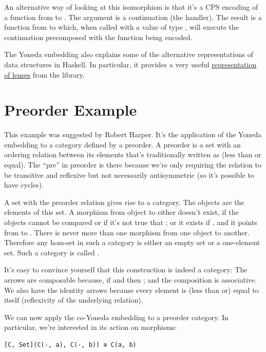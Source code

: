 An alternative way of looking at this isomorphism is that it's a CPS
encoding of a function from  to . The argument
 is a continuation (the handler). The result
is a function from  to  which, when called with a
value of type , will execute the continuation precomposed with
the function being encoded.

The Yoneda embedding also explains some of the alternative
representations of data structures in Haskell. In particular, it
provides a very useful
\href{https://bartoszmilewski.com/2015/07/13/from-lenses-to-yoneda-embedding/}{representation
of lenses} from the  library.

\section{Preorder Example}\label{preorder-example}

This example was suggested by Robert Harper. It's the application of the
Yoneda embedding to a category defined by a preorder. A preorder is a
set with an ordering relation between its elements that's traditionally
written as \code{<=} (less than or equal). The ``pre'' in
preorder is there because we're only requiring the relation to be
transitive and reflexive but not necessarily antisymmetric (so it's
possible to have cycles).

A set with the preorder relation gives rise to a category. The objects
are the elements of this set. A morphism from object  to
 either doesn't exist, if the objects cannot be compared or if
it's not true that ; or it exists if
, and it points from  to
. There is never more than one morphism from one object to
another. Therefore any hom-set in such a category is either an empty set
or a one-element set. Such a category is called .

It's easy to convince yourself that this construction is indeed a
category: The arrows are composable because, if
 and  then
; and the composition is associative. We also
have the identity arrows because every element is (less than or) equal
to itself (reflexivity of the underlying relation).

We can now apply the co-Yoneda embedding to a preorder category. In
particular, we're interested in its action on morphisms:

\begin{Verbatim}[commandchars=\\\{\}]
[C, Set](C(-, a), C(-, b)) ≅ C(a, b)
\end{Verbatim}

